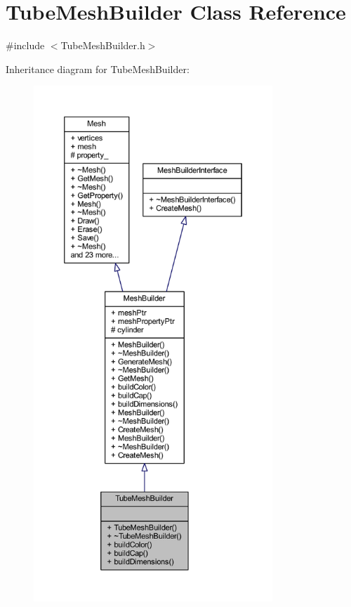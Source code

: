 \hypertarget{class_tube_mesh_builder}{}\section{Tube\+Mesh\+Builder Class Reference}
\label{class_tube_mesh_builder}


{\ttfamily \#include $<$Tube\+Mesh\+Builder.\+h$>$}



Inheritance diagram for Tube\+Mesh\+Builder\+:\nopagebreak
\begin{figure}[H]
\begin{center}
\leavevmode
\includegraphics[height=550pt]{class_tube_mesh_builder__inherit__graph}
\end{center}
\end{figure}


